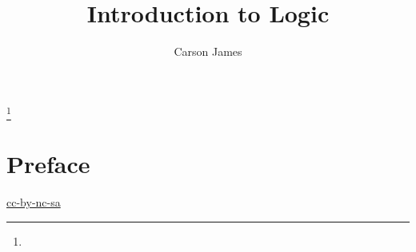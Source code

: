 \documentclass{book}
\begin{document}
	
	\frontmatter
	
	\title{Introduction to Logic}
	
	
	\author{Carson James}
	\thanks{}
	
	\date{}
	
	\maketitle
	
	
	\setcounter{page}{4}
	
	\tableofcontents
	\printunsrtglossary[type=symbols,style=long,title={Notation}]
	
	
	\mainmatter
	
	\chapter*{Preface}
	
	\begin{flushleft}
		\href{https://creativecommons.org/licenses/by-nc-sa/4.0/legalcode.txt}{cc-by-nc-sa}
	\end{flushleft}
	
	\newpage
	
	








   
\end{document}
